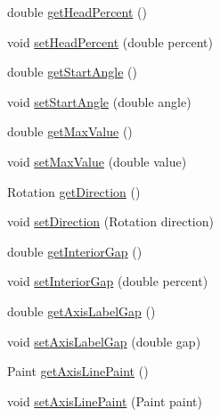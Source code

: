 \begin{DoxyCompactItemize}
double \mbox{\hyperlink{classorg_1_1jfree_1_1chart_1_1plot_1_1_spider_web_plot_a719092ea7539720554b6716f1cd48a16}{get\+Head\+Percent}} ()
\item 
void \mbox{\hyperlink{classorg_1_1jfree_1_1chart_1_1plot_1_1_spider_web_plot_a747ddb161e3cd2dffee8a0e87737767e}{set\+Head\+Percent}} (double percent)
\item 
double \mbox{\hyperlink{classorg_1_1jfree_1_1chart_1_1plot_1_1_spider_web_plot_a5ac40ecb9b44741d1be501a5dfab73c8}{get\+Start\+Angle}} ()
\item 
void \mbox{\hyperlink{classorg_1_1jfree_1_1chart_1_1plot_1_1_spider_web_plot_afbc698066d679042f63a1010a0e4f7d0}{set\+Start\+Angle}} (double angle)
\item 
double \mbox{\hyperlink{classorg_1_1jfree_1_1chart_1_1plot_1_1_spider_web_plot_a696dc91dc7888409aa37f59e795e95d7}{get\+Max\+Value}} ()
\item 
void \mbox{\hyperlink{classorg_1_1jfree_1_1chart_1_1plot_1_1_spider_web_plot_ab89290b685699d2351f594c7157689ee}{set\+Max\+Value}} (double value)
\item 
Rotation \mbox{\hyperlink{classorg_1_1jfree_1_1chart_1_1plot_1_1_spider_web_plot_ac4d6cdf78a5f822b4f2a0a8ccca8a3f4}{get\+Direction}} ()
\item 
void \mbox{\hyperlink{classorg_1_1jfree_1_1chart_1_1plot_1_1_spider_web_plot_a298f02b4355b79c7961dbdab899323d9}{set\+Direction}} (Rotation direction)
\item 
double \mbox{\hyperlink{classorg_1_1jfree_1_1chart_1_1plot_1_1_spider_web_plot_abad1e3eb2dad1089d41ae206a2a56c3a}{get\+Interior\+Gap}} ()
\item 
void \mbox{\hyperlink{classorg_1_1jfree_1_1chart_1_1plot_1_1_spider_web_plot_aa1d77acd75dcfc16982750d3ec686a67}{set\+Interior\+Gap}} (double percent)
\item 
double \mbox{\hyperlink{classorg_1_1jfree_1_1chart_1_1plot_1_1_spider_web_plot_a7b9f148b29a57cb490d788a6b6208e38}{get\+Axis\+Label\+Gap}} ()
\item 
void \mbox{\hyperlink{classorg_1_1jfree_1_1chart_1_1plot_1_1_spider_web_plot_a3b64f9217fe3d9ecc2ee4f3bed7f2d6b}{set\+Axis\+Label\+Gap}} (double gap)
\item 
Paint \mbox{\hyperlink{classorg_1_1jfree_1_1chart_1_1plot_1_1_spider_web_plot_a552604854e1b6d275f5dd2d94543ca7c}{get\+Axis\+Line\+Paint}} ()
\item 
void \mbox{\hyperlink{classorg_1_1jfree_1_1chart_1_1plot_1_1_spider_web_plot_a9cb56a1a5989adca77738f49e7d387d9}{set\+Axis\+Line\+Paint}} (Paint paint)

\end{DoxyCompactItemize}
